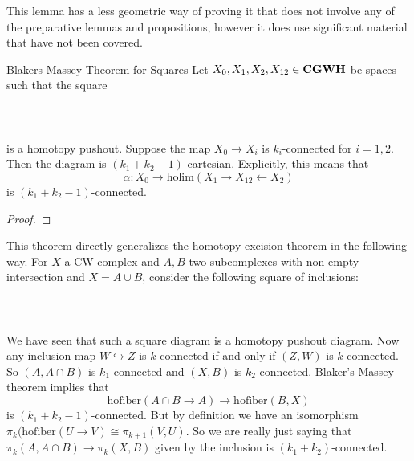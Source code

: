 \documentclass[a4paper]{article}
\begin{document}
This lemma has a less geometric way of proving it that does not involve any of the preparative lemmas and propositions, however it does use significant material that have not been covered. 

\begin{thm}{Blakers-Massey Theorem for Squares}{} Let $X_0,X_1,X_2,X_{12}\in\bold{CGWH}$ be spaces such that the square \\~\\
\\~\\
is a homotopy pushout. Suppose the map $X_0\to X_i$ is $k_i$-connected for $i=1,2$. Then the diagram is $(k_1+k_2-1)$-cartesian. Explicitly, this means that $$\alpha:X_0\to\text{holim}(X_1\rightarrow X_{12}\leftarrow X_2)$$ is $(k_1+k_2-1)$-connected. \tcbline
\begin{proof}

\end{proof}
\end{thm}

This theorem directly generalizes the homotopy excision theorem in the following way. For $X$ a CW complex and $A,B$ two subcomplexes with non-empty intersection and $X=A\cup B$, consider the following square of inclusions: \\~\\
\\~\\
We have seen that such a square diagram is a homotopy pushout diagram. Now any inclusion map $W\hookrightarrow Z$ is $k$-connected if and only if $(Z,W)$ is $k$-connected. So $(A,A\cap B)$ is $k_1$-connected and $(X,B)$ is $k_2$-connected. Blaker's-Massey theorem implies that $$\text{hofiber}(A\cap B\to A)\to\text{hofiber}(B,X)$$ is $(k_1+k_2-1)$-connected. But by definition we have an isomorphism $\pi_k(\text{hofiber}(U\to V)\cong\pi_{k+1}(V,U)$. So we are really just saying that $\pi_k(A,A\cap B)\to\pi_k(X,B)$ given by the inclusion is $(k_1+k_2)$-connected. 
\end{document}
